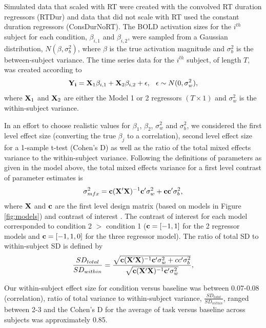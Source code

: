 \documentclass[titlepage,12pt] {article}
\begin{document}
Simulated data that scaled with RT were created with the convolved RT duration regressors (RTDur) and data that did not scale with RT used the constant duration regressors (ConsDurNoRT).  The BOLD activation sizes for the $i^{th}$ subject for each condition, $\beta_{i, 1}$ and $\beta_{i,2}$, were  sampled from a Gaussian distribution, $N(\beta, \sigma_b^2)$,  where $\beta$ is the true activation magnitude and $\sigma^2_b$ is the between-subject variance.  The time series data for the $i^{th}$ subject, of length $T$, was created according to 
\begin{equation} \label{eq:timeseries}
   \vb{Y_i} = \vb{X}_{1}\beta_{i, 1}  +  \vb{X}_{2}\beta_{i, 2} + \epsilon, \hspace{.1in} \epsilon \sim N(0, \sigma^2_w), 
\end{equation}
where $\vb{X}_{1}$ and $\vb{X}_{2}$  are either the Model 1 or 2 regressors $(T\times 1)$  and $\sigma^2_w$ is the within-subject variance.  


In an effort to choose realistic values for $\beta_1$, $\beta_2$, $\sigma^2_w$ and $\sigma^2_b$, we considered the first level effect size (converting the true $\beta_j$ to a  correlation), second level effect size for a 1-sample t-test (Cohen's D) as well as the ratio of the total mixed effects variance to the within-subject variance.  Following the definitions of parameters as given in the model above, the total mixed effects variance for a first level contrast of parameter estimates is
\begin{equation} \label{eq:mfxvar}
 \sigma^2_{mfx} =  \vb{c}(\vb{X}'\vb{X})^{-1}\vb{c}'\sigma^2_{w} +\vb{c}\vb{c}'\sigma^2_b,
\end{equation}
where $\vb{X}$ and $\vb{c}$ are the first level design matrix (based on models in Figure \ref{fig:models}) and contrast of interest \citep{mumford_modeling_2006}.  The contrast of interest for each model corresponded to condition 2 $>$ condition 1 ($\vb{c}=[-1,1]$ for the 2 regressor models and $\vb{c}=[-1,1, 0]$ for the three regressor model).  The ratio of total SD to within-subject SD is defined by
\begin{equation}\label{eq:sd_ratio}
\frac{SD_{total}}{SD_{within}} = \frac{\sqrt{\vb{c}(\vb{X}'\vb{X})^{-1}\vb{c}'\sigma^2_{w} + cc'\sigma^2_b}} {\sqrt{\vb{c}(\vb{X}'\vb{X})^{-1}\vb{c}'\sigma^2_{w}}},
\end{equation}

Our within-subject effect size for condition versus baseline was between 0.07-0.08 (correlation), ratio of total variance to within-subject variance, $\frac{SD_{total}}{SD_{within}}$,  ranged between 2-3 and the Cohen's D for the average of task versus baseline across subjects was approximately 0.85.
\end{document}
